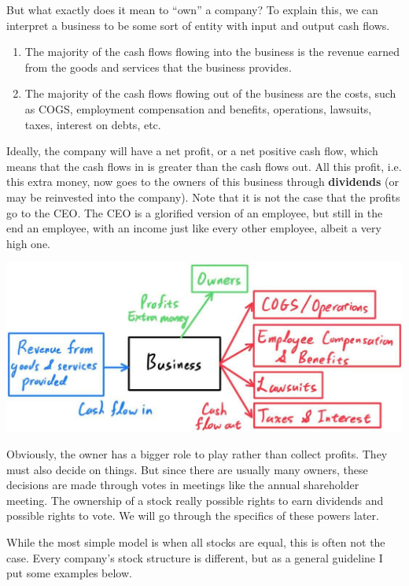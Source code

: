 \documentclass{article}
\begin{document}
    But what exactly does it mean to ``own'' a company? To explain this, we can interpret a business to be some sort of entity with input and output cash flows.
    \begin{enumerate}
      \item The majority of the cash flows flowing into the business is the revenue earned from the goods and services that the business provides. 
      \item The majority of the cash flows flowing out of the business are the costs, such as COGS, employment compensation and benefits, operations, lawsuits, taxes, interest on debts, etc.
    \end{enumerate}
    Ideally, the company will have a net profit, or a net positive cash flow, which means that the cash flows in is greater than the cash flows out. All this profit, i.e. this extra money, now goes to the owners of this business through \textbf{dividends} (or may be reinvested into the company). Note that it is not the case that the profits go to the CEO. The CEO is a glorified version of an employee, but still in the end an employee, with an income just like every other employee, albeit a very high one. 
    \begin{center}
      \includegraphics[scale=0.27]{img/Business_Cash_Flow.jpg}
    \end{center}
    Obviously, the owner has a bigger role to play rather than collect profits. They must also decide on things. But since there are usually many owners, these decisions are made through votes in meetings like the annual shareholder meeting. The ownership of a stock really possible rights to earn dividends and possible rights to vote. We will go through the specifics of these powers later. 

    While the most simple model is when all stocks are equal, this is often not the case. Every company's stock structure is different, but as a general guideline I put some examples below. 
\end{document}
